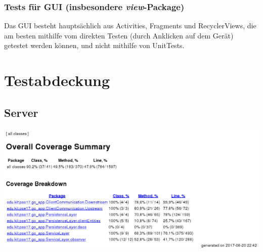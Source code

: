 \documentclass[11pt,a4paper]{scrartcl}
\begin{document}
\subsubsection{Tests für GUI (insbesondere \textit{view}-Package)}
Das GUI besteht hauptsächlich aus Activities, Fragments und RecyclerViews, die am besten mithilfe vom direkten Testen (durch Anklicken auf dem Gerät) getestet werden können, und nicht mithilfe von UnitTests. 


\newpage

\section{Testabdeckung}
\subsection{Server}


\begin{center}
	\includegraphics[width=1.0\linewidth]{ServerTestCoverage}
\end{center}
\end{document}
